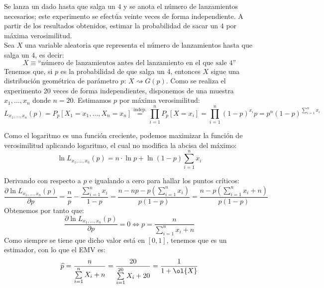 \begin{ejercicio}\label{ej:5_rel5}
    Se lanza un dado hasta que salga un $4$ y se anota el número de lanzamientos necesarios; este experimento se efectúa veinte veces de forma independiente. A partir de los resultados obtenidos, estimar la probabilidad de sacar un $4$ por máxima verosimilitud.\\

    \noindent
    Sea $X$ una variable aleatoria que representa el número de lanzamientos hasta que salga un $4$, es decir:
    \begin{equation*}
        X \equiv \text{``número de lanzamientos antes del lanzamiento en el que sale 4''}
    \end{equation*}
    Tenemos que, si $p$ es la probabilidad de que salga un 4, entonces $X$ sigue una distribución geométrica de parámetro $p$: $X\rightsquigarrow G(p)$. Como se realiza el experimento 20 veces de forma independientes, disponemos de una muestra $x_1, \ldots, x_n$ donde $n=20$. Estimamos $p$ por máxima verosimilitud:
    \begin{equation*}
        L_{x_1,\ldots,x_{n}}(p) = P_p[X_1 =x_1, \ldots, X_n=x_n] \stackrel{\text{indep.}}{=} \prod_{i=1}^{n} P_p[X=x_i] = \prod_{i=1}^{n} {(1-p)}^{x_i}p = p^{n}{(1-p)}^{\sum\limits_{i=1}^{n}x_i}
    \end{equation*}
    
    Como el logaritmo es una función creciente, podemos maximizar la función de verosimilitud aplicando logaritmo, el cual no modifica la abcisa del máximo:
    \begin{equation*}
        \ln L_{x_1,\ldots,x_n}(p) = n\cdot \ln p + \ln(1-p)\sum_{i=1}^{n}x_i
    \end{equation*}
    
    Derivando con respecto a $p$ e igualando a cero para hallar los puntos críticos:
    \begin{equation*}
        \dfrac{\partial \ln L_{x_1,\ldots,x_n}(p)}{\partial p} = \frac{n}{p} - \frac{\sum\limits_{i=1}^{n}x_i}{1-p} = \frac{n - np - p\left(\sum\limits_{i=1}^{n}x_i\right)}{p(1-p)} = \frac{n - p\left(\sum\limits_{i=1}^{n}x_i +n\right)}{p(1-p)}
    \end{equation*}
    Obtenemos por tanto que:
    \begin{equation*}
        \dfrac{\partial \ln L_{x_1,\ldots,x_n}(p)}{\partial  p} = 0 \Longleftrightarrow p = \frac{n}{\sum\limits_{i=1}^{n}x_i + n}
    \end{equation*}
    Como siempre se tiene que dicho valor está en $[0,1]$, tenemos que es un estimador, con lo que el EMV es:
    \begin{equation*}
        \widehat{p} = \frac{n}{\sum\limits_{i=1}^{n}X_i+n} = \frac{20}{\sum\limits_{i=1}^{20}X_i+20} = \frac{1}{1+\ol{X}}
    \end{equation*}
\end{ejercicio}

